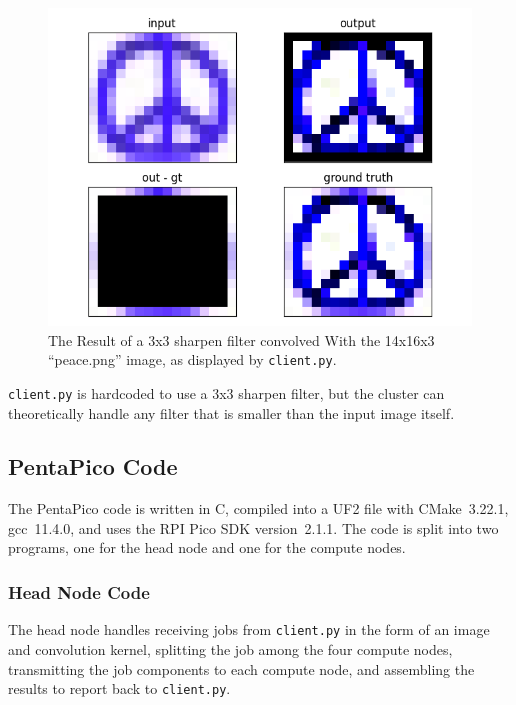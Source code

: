 \documentclass[conference]{IEEEtran}
\begin{document}
\begin{figure}[ht]
\includegraphics[width=\linewidth]{client.png}
\caption{The Result of a 3x3 sharpen filter convolved With the 14x16x3 ``peace.png'' image, as displayed by \texttt{client.py}.}
\label{client_result_figure}
\end{figure}

\texttt{client.py} is hardcoded to use a 3x3 sharpen filter, but the cluster can theoretically handle any filter  that is smaller than the input image itself.

\subsection{PentaPico Code}

The PentaPico code is written in C, compiled into a UF2 file with CMake~3.22.1, gcc~11.4.0, and uses the RPI Pico SDK version~2.1.1.
The code is split into two programs, one for the head node and one for the compute nodes.

\subsubsection{Head Node Code}
\label{head_node_sec}

The head node handles receiving jobs from \texttt{client.py} in the form of an image and convolution kernel, splitting the job among the four compute nodes, transmitting the job components to each compute node, and assembling the results to report back to \texttt{client.py}.
\end{document}
